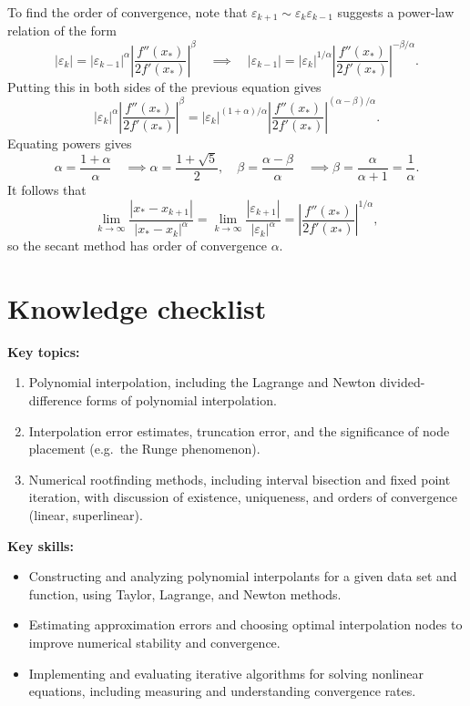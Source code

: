 \documentclass[
  letterpaper,
  DIV=11,
  numbers=noendperiod]{scrreprt}
\begin{document}
To find the order of convergence, note that
\(\varepsilon_{k+1}\sim \varepsilon_k\varepsilon_{k-1}\) suggests a
power-law relation of the form \[
|\varepsilon_k| = |\varepsilon_{k-1}|^\alpha\left|\frac{f''(x_*)}{2f'(x_*)}\right|^\beta \quad \implies \quad |\varepsilon_{k-1}| = |\varepsilon_k|^{1/\alpha}\left|\frac{f''(x_*)}{2f'(x_*)}\right|^{-\beta/\alpha}.
\] Putting this in both sides of the previous equation gives \[
|\varepsilon_{k}|^\alpha\left|\frac{f''(x_*)}{2f'(x_*)}\right|^\beta = |\varepsilon_k|^{(1+\alpha)/\alpha}\left|\frac{f''(x_*)}{2f'(x_*)}\right|^{(\alpha-\beta)/\alpha}.
\] Equating powers gives \[
\alpha = \frac{1+\alpha}{\alpha} \quad \implies \alpha = \frac{1 + \sqrt{5}}{2}, \quad \beta = \frac{\alpha - \beta}{\alpha} \quad \implies \beta = \frac{\alpha}{\alpha + 1} = \frac{1}{\alpha}.
\] It follows that \[
\lim_{k\to\infty}\frac{|x_* - x_{k+1}|}{|x_* - x_k|^\alpha} = \lim_{k\to\infty}\frac{|\varepsilon_{k+1}|}{|\varepsilon_k|^\alpha} = \left|\frac{f''(x_*)}{2f'(x_*)}\right|^{1/\alpha},
\] so the secant method has order of convergence \(\alpha\).

\section*{Knowledge checklist}\label{knowledge-checklist-1}


\textbf{Key topics:}

\begin{enumerate}
\def\labelenumi{\arabic{enumi}.}
\item
  Polynomial interpolation, including the Lagrange and Newton
  divided-difference forms of polynomial interpolation.
\item
  Interpolation error estimates, truncation error, and the significance
  of node placement (e.g.~the Runge phenomenon).
\item
  Numerical rootfinding methods, including interval bisection and fixed
  point iteration, with discussion of existence, uniqueness, and orders
  of convergence (linear, superlinear).
\end{enumerate}

\textbf{Key skills:}

\begin{itemize}
\item
  Constructing and analyzing polynomial interpolants for a given data
  set and function, using Taylor, Lagrange, and Newton methods.
\item
  Estimating approximation errors and choosing optimal interpolation
  nodes to improve numerical stability and convergence.
\item
  Implementing and evaluating iterative algorithms for solving nonlinear
  equations, including measuring and understanding convergence rates.
\end{itemize}
\end{document}
